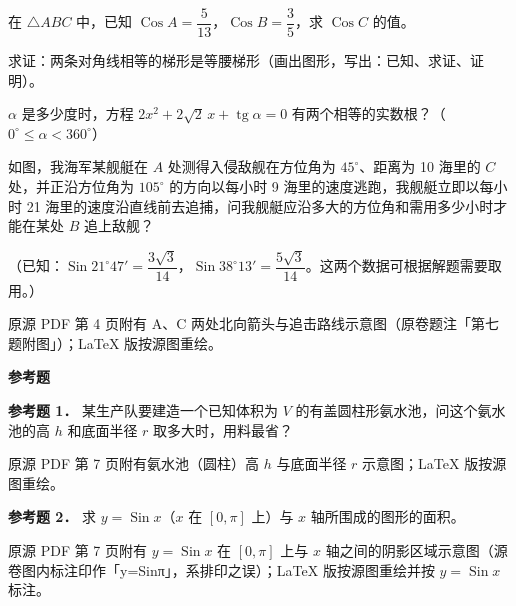 \begin{question}
在 $\triangle ABC$ 中，已知 $\operatorname{Cos}A=\dfrac5{13}$，$\operatorname{Cos}B=\dfrac35$，求 $\operatorname{Cos}C$ 的值。

\end{question}
\begin{question}
求证：两条对角线相等的梯形是等腰梯形（画出图形，写出：已知、求证、证明）。

\end{question}
\begin{question}
$\alpha$ 是多少度时，方程 $2x^2+2\sqrt2\,x+\operatorname{tg}\alpha=0$ 有两个相等的实数根？（$0^\circ\le\alpha<360^\circ$）

\Needspace{0.4\textheight}
\end{question}
\begin{question}
如图，我海军某舰艇在 $A$ 处测得入侵敌舰在方位角为 $45^\circ$、距离为 10 海里的 $C$ 处，并正沿方位角为 $105^\circ$ 的方向以每小时 9 海里的速度逃跑，我舰艇立即以每小时 21 海里的速度沿直线前去追捕，问我舰艇应沿多大的方位角和需用多少小时才能在某处 $B$ 追上敌舰？

（已知：$\operatorname{Sin}21^\circ47'=\dfrac{3\sqrt3}{14}$，$\operatorname{Sin}38^\circ13'=\dfrac{5\sqrt3}{14}$。这两个数据可根据解题需要取用。）

\begin{gktip}
原源 PDF 第 4 页附有 A、C 两处北向箭头与追击路线示意图（原卷题注「第七题附图」）；LaTeX 版按源图重绘。
\end{gktip}
\nopagebreak[4]
\begin{center}\end{center}
\nopagebreak[4]
\begin{gktip}
\textbf{参考题}
\end{gktip}

\textbf{参考题 1．} 某生产队要建造一个已知体积为 $V$ 的有盖圆柱形氨水池，问这个氨水池的高 $h$ 和底面半径 $r$ 取多大时，用料最省？

\begin{gktip}
原源 PDF 第 7 页附有氨水池（圆柱）高 $h$ 与底面半径 $r$ 示意图；LaTeX 版按源图重绘。
\end{gktip}
\nopagebreak[4]
\begin{center}\end{center}
\nopagebreak[4]
\textbf{参考题 2．} 求 $y=\operatorname{Sin}x$（$x$ 在 $[0,\pi]$ 上）与 $x$ 轴所围成的图形的面积。
\nopagebreak[4]
\begin{center}\end{center}
\nopagebreak[4]
\begin{gktip}
原源 PDF 第 7 页附有 $y=\operatorname{Sin}x$ 在 $[0,\pi]$ 上与 $x$ 轴之间的阴影区域示意图（源卷图内标注印作「y=Sinπ」，系排印之误）；LaTeX 版按源图重绘并按 $y=\operatorname{Sin}x$ 标注。
\end{gktip}


\end{question}